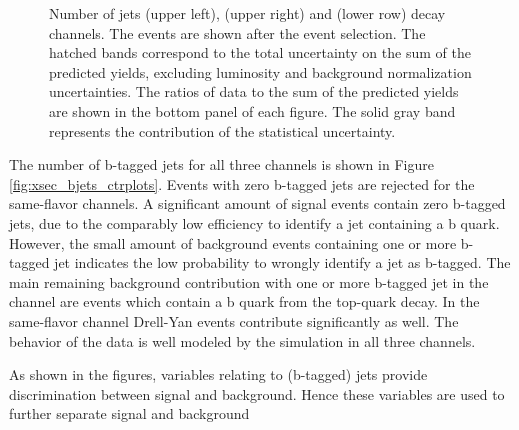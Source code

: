 \begin{figure}[htbp!]
\begin{center}
    \caption{Number of jets \emu (upper left), \mumu (upper right) and \ee (lower row) decay channels.
        The events are shown after the
        event selection.  The hatched
        bands correspond to the total uncertainty on the sum of the
        predicted yields, excluding luminosity and background
        normalization uncertainties. 
        The ratios of data to the sum of the predicted yields are
        shown in the bottom panel of each figure. The solid gray band
        represents the contribution of the statistical uncertainty.}  
       \label{fig:xsec_jets_ctrplots}
  \end{center}
\end{figure}

The number of b-tagged jets for all three channels is shown in Figure \ref{fig:xsec_bjets_ctrplots}.
Events with zero b-tagged jets are rejected for the same-flavor channels.
A significant amount of \ttbar signal events contain zero b-tagged jets, due to the comparably low efficiency to identify a jet containing a b quark.
However, the small amount of background events containing one or more b-tagged jet indicates the low probability to wrongly identify a jet as b-tagged.
The main remaining background contribution with one or more b-tagged jet in the \emu channel are events which contain a b quark from the top-quark decay.
In the same-flavor channel Drell-Yan events contribute significantly as well.
The behavior of the data is well modeled by the simulation in all three channels.

As shown in the figures, variables relating to (b-tagged) jets provide discrimination between signal and background. Hence these variables
are used to further separate signal and background

